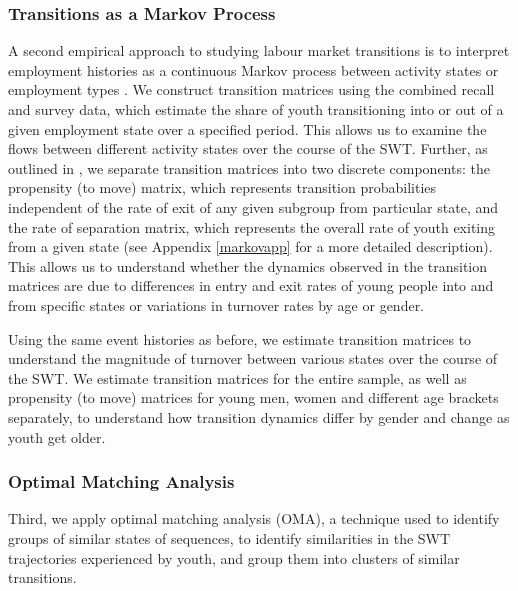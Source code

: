 \documentclass[
  a4paper, twoside, 12pt]{book}
\begin{document}
\hypertarget{markov}{%
\subsubsection*{Transitions as a Markov Process}\label{markov}}

A second empirical approach to studying labour market transitions is to interpret employment histories as a continuous Markov process between activity states or employment types \autocite{cunningham2011,bosch2007}. We construct transition matrices using the combined recall and survey data, which estimate the share of youth transitioning into or out of a given employment state over a specified period. This allows us to examine the flows between different activity states over the course of the SWT. Further, as outlined in \textcite{bosch2007}, we separate transition matrices into two discrete components: the propensity (to move) matrix, which represents transition probabilities independent of the rate of exit of any given subgroup from particular state, and the rate of separation matrix, which represents the overall rate of youth exiting from a given state (see Appendix \ref{markovapp} for a more detailed description). This allows us to understand whether the dynamics observed in the transition matrices are due to differences in entry and exit rates of young people into and from specific states or variations in turnover rates by age or gender.

Using the same event histories as before, we estimate transition matrices to understand the magnitude of turnover between various states over the course of the SWT. We estimate transition matrices for the entire sample, as well as propensity (to move) matrices for young men, women and different age brackets separately, to understand how transition dynamics differ by gender and change as youth get older.

\hypertarget{oma}{%
\subsubsection*{Optimal Matching Analysis}\label{oma}}

Third, we apply optimal matching analysis (OMA), a technique used to identify groups of similar states of sequences, to identify similarities in the SWT trajectories experienced by youth, and group them into clusters of similar transitions.
\end{document}
